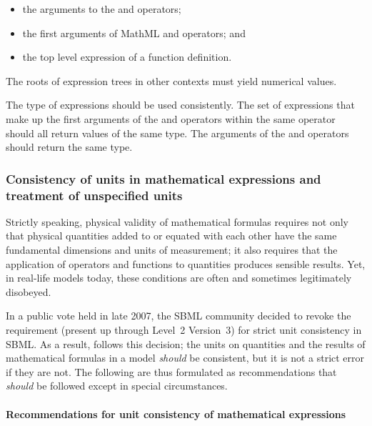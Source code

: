 \begin{itemize}\setlength{\parskip}{-0.2ex}

\item the arguments to the  and  operators;

\item the first arguments of MathML  and 
operators; and

\item the top level expression of a function definition.

\end{itemize}

The roots of expression trees in other contexts must yield
numerical values.

The type of expressions should be used consistently.  The set of
expressions that make up the first arguments of the 
and  operators within the same 
operator should all return values of the same type. The arguments
of the  and  operators should return the same
type.


\subsubsection{Consistency of units in mathematical expressions
  and treatment of unspecified units}
\label{sec:operator-arg-types}

Strictly speaking, physical validity of mathematical formulas
requires not only that physical quantities added to or equated
with each other have the same fundamental dimensions and units of
measurement; it also requires that the application of operators
and functions to quantities produces sensible results.  Yet, in
real-life models today, these conditions are often and sometimes
legitimately disobeyed.

In a public vote held in late 2007, the SBML community decided to
revoke the requirement (present up through Level~2 Version~3) for
strict unit consistency in SBML.  As a result, \thisLV
follows this decision; the units on quantities and the results
of mathematical formulas in a model \emph{should} be consistent,
but it is not a strict error if they are not.  The following are
thus formulated as recommendations that \emph{should} be followed
except in special circumstances.


\paragraph{Recommendations for unit consistency of mathematical expressions}

